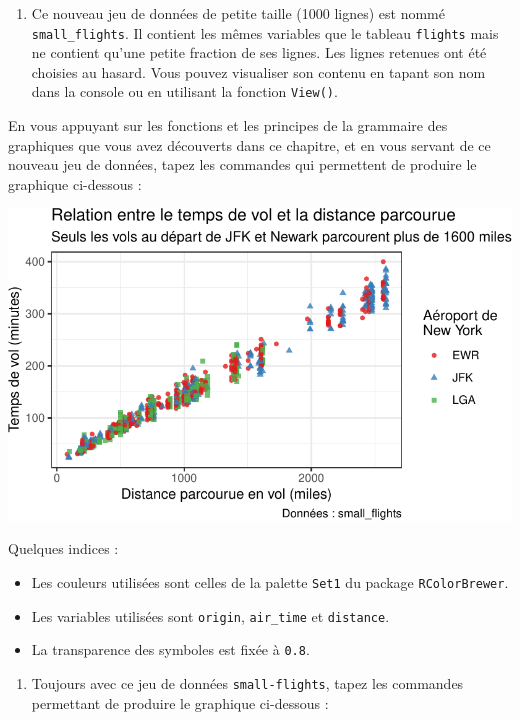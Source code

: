 \documentclass[
  a4paper,
  DIV=11,
  numbers=noendperiod,
  oneside]{scrreprt}
\providecommand{\tightlist}{%
  \setlength{\itemsep}{0pt}\setlength{\parskip}{0pt}}\usepackage{longtable,booktabs,array}
\begin{document}
\begin{enumerate}
\def\labelenumi{\arabic{enumi}.}
\setcounter{enumi}{6}
\tightlist
\item
  Ce nouveau jeu de données de petite taille (1000 lignes) est nommé
  \texttt{small\_flights}. Il contient les mêmes variables que le
  tableau \texttt{flights} mais ne contient qu'une petite fraction de
  ses lignes. Les lignes retenues ont été choisies au hasard. Vous
  pouvez visualiser son contenu en tapant son nom dans la console ou en
  utilisant la fonction \texttt{View()}.
\end{enumerate}

En vous appuyant sur les fonctions et les principes de la grammaire des
graphiques que vous avez découverts dans ce chapitre, et en vous servant
de ce nouveau jeu de données, tapez les commandes qui permettent de
produire le graphique ci-dessous :

\includegraphics{03-visualization_files/figure-pdf/unnamed-chunk-118-1.pdf}

Quelques indices :

\begin{itemize}
\tightlist
\item
  Les couleurs utilisées sont celles de la palette \texttt{Set1} du
  package \texttt{RColorBrewer}.
\item
  Les variables utilisées sont \texttt{origin}, \texttt{air\_time} et
  \texttt{distance}.
\item
  La transparence des symboles est fixée à \texttt{0.8}.
\end{itemize}

\begin{enumerate}
\def\labelenumi{\arabic{enumi}.}
\setcounter{enumi}{7}
\tightlist
\item
  Toujours avec ce jeu de données \texttt{small-flights}, tapez les
  commandes permettant de produire le graphique ci-dessous :
\end{enumerate}
\end{document}
